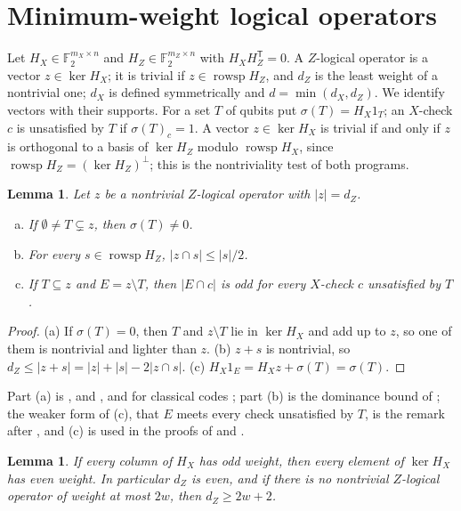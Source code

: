 \documentclass[11pt]{amsart}
\newtheorem{lemma}[theorem]{Lemma}
\theoremstyle{definition}
\theoremstyle{remark}
\newcommand{\F}{\mathbb F_2}
\newcommand{\rowsp}{\operatorname{rowsp}}
\newcommand{\tp}{^{\mathsf T}}
\begin{document}
\section{Minimum-weight logical operators}\label{sec:lemmas}

Let $H_X\in\F^{m_X\times n}$ and $H_Z\in\F^{m_Z\times n}$ with $H_XH_Z\tp=0$. A $Z$-logical operator is a vector $z\in\ker H_X$; it is trivial if $z\in\rowsp H_Z$, and $d_Z$ is the least weight of a nontrivial one; $d_X$ is defined symmetrically and $d=\min(d_X,d_Z)$. We identify vectors with their supports. For a set $T$ of qubits put $\sigma(T)=H_X1_T$; an $X$-check $c$ is unsatisfied by $T$ if $\sigma(T)_c=1$. A vector $z\in\ker H_X$ is trivial if and only if $z$ is orthogonal to a basis of $\ker H_Z$ modulo $\rowsp H_X$, since $\rowsp H_Z=(\ker H_Z)^\perp$; this is the nontriviality test of both programs.

\begin{lemma}\label{lem:minimal}
Let $z$ be a nontrivial $Z$-logical operator with $|z|=d_Z$.
\begin{enumerate}[(a)]
\item If $\emptyset\ne T\subsetneq z$, then $\sigma(T)\ne0$.
\item For every $s\in\rowsp H_Z$, $|z\cap s|\le|s|/2$.
\item If $T\subseteq z$ and $E=z\setminus T$, then $|E\cap c|$ is odd for every $X$-check $c$ unsatisfied by $T$.
\end{enumerate}
\end{lemma}

\begin{proof}
(a) If $\sigma(T)=0$, then $T$ and $z\setminus T$ lie in $\ker H_X$ and add up to $z$, so one of them is nontrivial and lighter than $z$. (b) $z+s$ is nontrivial, so $d_Z\le|z+s|=|z|+|s|-2|z\cap s|$. (c) $H_X1_E=H_Xz+\sigma(T)=\sigma(T)$.
\end{proof}

Part (a) is \cite[Lemma~2]{RD26}, \cite[Lemma~2]{OK26} and \cite[Suppl.\ Inf., Lemma~5.1]{CGP26}, and for classical codes \cite[\S V, Lemma~3]{DKP17}; part (b) is the dominance bound of \cite[Suppl.\ Inf., eq.~(S42)]{CGP26}; the weaker form of (c), that $E$ meets every check unsatisfied by $T$, is the remark after \cite[Lemma~2]{RD26}, and (c) is used in the proofs of \cite[Thm.~2]{OK26} and \cite[Suppl.\ Inf., \S5.5.1]{CGP26}.

\begin{lemma}\label{lem:parity}
If every column of $H_X$ has odd weight, then every element of $\ker H_X$ has even weight. In particular $d_Z$ is even, and if there is no nontrivial $Z$-logical operator of weight at most $2w$, then $d_Z\ge2w+2$.
\end{lemma}
\end{document}
